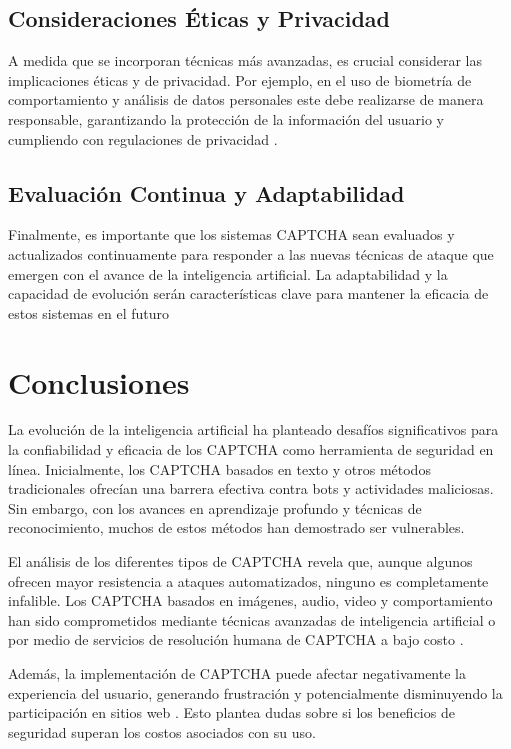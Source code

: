\documentclass[conference]{IEEEtran}
\begin{document}
\subsection{Consideraciones Éticas y Privacidad}

A medida que se incorporan técnicas más avanzadas, es crucial considerar las implicaciones éticas y de privacidad. Por ejemplo, en el uso de biometría de comportamiento y análisis de datos personales este debe realizarse de manera responsable, garantizando la protección de la información del usuario y cumpliendo con regulaciones de privacidad \cite{Murdoch2020}. 

\subsection{Evaluación Continua y Adaptabilidad}

Finalmente, es importante que los sistemas CAPTCHA sean evaluados y actualizados continuamente para responder a las nuevas técnicas de ataque que emergen con el avance de la inteligencia artificial. La adaptabilidad y la capacidad de evolución serán características clave para mantener la eficacia de estos sistemas en el futuro

\bigskip

\section{Conclusiones}

La evolución de la inteligencia artificial ha planteado desafíos significativos para la confiabilidad y eficacia de los CAPTCHA como herramienta de seguridad en línea. Inicialmente, los CAPTCHA basados en texto y otros métodos tradicionales ofrecían una barrera efectiva contra bots y actividades maliciosas. Sin embargo, con los avances en aprendizaje profundo y técnicas de reconocimiento, muchos de estos métodos han demostrado ser vulnerables.

El análisis de los diferentes tipos de CAPTCHA revela que, aunque algunos ofrecen mayor resistencia a ataques automatizados, ninguno es completamente infalible. Los CAPTCHA basados en imágenes, audio, video y comportamiento han sido comprometidos mediante técnicas avanzadas de inteligencia artificial o por medio de servicios de resolución humana de CAPTCHA a bajo costo \cite{Sivakorn2016, Motoyama2010}.

Además, la implementación de CAPTCHA puede afectar negativamente la experiencia del usuario, generando frustración y potencialmente disminuyendo la participación en sitios web \cite{Yan2008, Gafni2019}. Esto plantea dudas sobre si los beneficios de seguridad superan los costos asociados con su uso.
\end{document}
